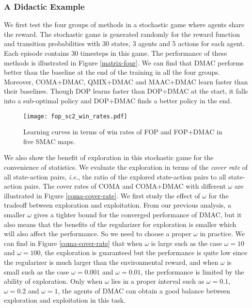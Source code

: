 \documentclass{article}
\begin{document}
\subsubsection*{A Didactic Example}


We first test the four groups of methods in a stochastic game where agents share the reward. The stochastic game is generated randomly for the reward function and transition probabilities with 30 states, 3 agents and 5 actions for each agent. Each episode contains 30 timesteps in this game. The performance of these methods is illustrated in Figure \ref{matrix-four}.  We can find that DMAC performs better than the baseline at the end of the training in all the four groups. Moreover, COMA+DMAC, QMIX+DMAC and MAAC+DMAC learn faster than their baselines. Though DOP learns faster than DOP+DMAC at the start, it falls into a sub-optimal policy and DOP+DMAC finds a better policy in the end. 




\begin{figure*}[t]
	\centering
	\texttt{[image: fop\_sc2\_win\_rates.pdf]}
	\vspace*{-0.7cm}
	\caption{Learning curves in terms of win rates of FOP and FOP+DMAC in five SMAC maps. }
	\label{fop-sc2}
	\vspace{-0.2cm}
\end{figure*}

We also show the benefit of exploration in this stochastic game for the convenience of statistics.  We evaluate the exploration in terms of the \textit{cover rate} of all state-action pairs, \textit{i.e.}, the ratio of the explored state-action pairs to all state-action pairs. The cover rates of COMA and COMA+DMAC with different $\omega$ are illustrated in Figure \ref{coma-cover-rate}. We first study the  effect of $\omega$ for the tradeoff between exploration and exploitation. From our previous analysis, a smaller $\omega$ gives a tighter bound for the converged performance of DMAC, but it also means that the benefits of the regularizer for exploration is smaller which will also affect the performance. So we need to choose a proper $\omega$ in practice. We can find in Figure \ref{coma-cover-rate} that when $\omega$ is large such as the case $\omega = 10$ and $\omega =  100$, the exploration is guaranteed but the performance is quite low since the regularizer is much larger than the environmental reward, and when $\omega$ is small such as the case $\omega = 0.001$ and $\omega =  0.01$, the performance is limited by the ability of exploration. Only when $\omega$ lies in a proper interval such as $\omega = 0.1$, $\omega = 0.2$ and $\omega = 1$, the agents of DMAC can obtain a good balance between exploration and exploitation in this task.
\end{document}
